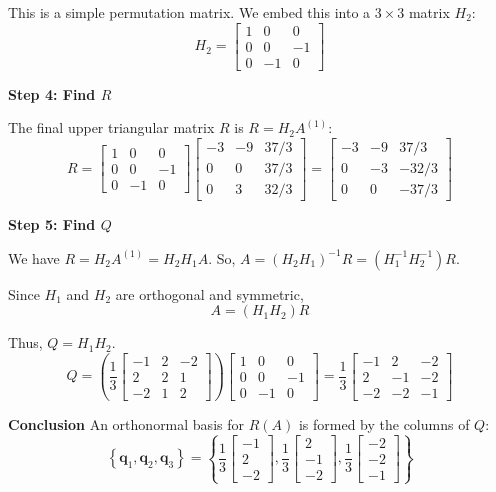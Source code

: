 \documentclass{article}
\newcommand{\0}{{\mathbf{0}}} %
\newcommand{\vect}[1]{\mathbf{#1}}
\begin{document}
This is a simple permutation matrix. We embed this into a $3 \times 3$ matrix $H_2$:
$$ H_2 =
\begin{bmatrix} 1 & 0 & 0 \\ 0 & 0 & -1 \\ 0 & -1 & 0
\end{bmatrix} $$

\textbf{Step 4: Find $R$}

The final upper triangular matrix $R$ is $R = H_2 A^{(1)}$:
$$ R =
\begin{bmatrix} 1 & 0 & 0 \\ 0 & 0 & -1 \\ 0 & -1 & 0
\end{bmatrix}
\begin{bmatrix} -3 & -9 & 37/3 \\ 0 & 0 & 37/3 \\ 0 & 3 & 32/3
\end{bmatrix} =
\begin{bmatrix} -3 & -9 & 37/3 \\ 0 & -3 & -32/3 \\ 0 & 0 & -37/3
\end{bmatrix} $$

\textbf{Step 5: Find $Q$}

We have $R = H_2 A^{(1)} = H_2 H_1 A$.
So, $A = (H_2 H_1)^{-1} R = (H_1^{-1} H_2^{-1}) R$.

Since $H_1$ and $H_2$ are orthogonal and symmetric,
$$A = (H_1 H_2) R$$

Thus, $Q = H_1 H_2$.
$$ Q = \left( \frac{1}{3}
\begin{bmatrix} -1 & 2 & -2 \\ 2 & 2 & 1 \\ -2 & 1 & 2
\end{bmatrix} \right)
\begin{bmatrix} 1 & 0 & 0 \\ 0 & 0 & -1 \\ 0 & -1 & 0
\end{bmatrix} = \frac{1}{3}
\begin{bmatrix} -1 & 2 & -2 \\ 2 & -1 & -2 \\ -2 & -2 & -1
\end{bmatrix} $$

\textbf{Conclusion}
An orthonormal basis for $R(A)$ is formed by the columns of $Q$:
$$ \left\{ \vect{q}_1, \vect{q}_2, \vect{q}_3 \right\} = \left\{ \frac{1}{3}
\begin{bmatrix} -1 \\ 2 \\ -2
\end{bmatrix}, \frac{1}{3}
\begin{bmatrix} 2 \\ -1 \\ -2
\end{bmatrix}, \frac{1}{3}
\begin{bmatrix} -2 \\ -2 \\ -1
\end{bmatrix} \right\} $$
\end{document}

